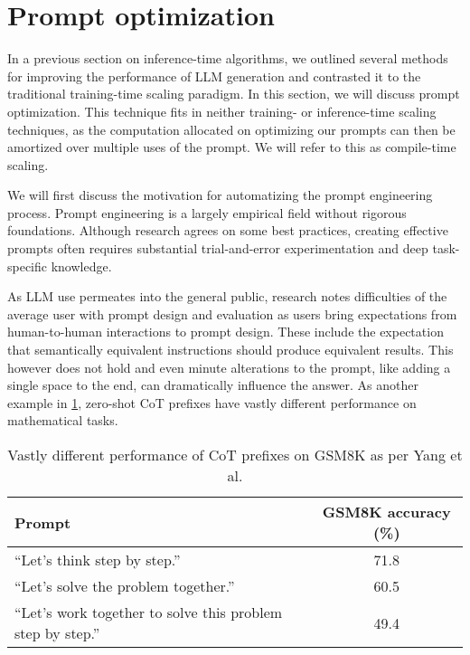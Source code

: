\section{Prompt optimization}
In a previous section on inference-time algorithms, we outlined several methods for improving the performance of LLM generation
and contrasted it to the traditional training-time scaling paradigm. In this section, we will discuss prompt optimization. 
This technique fits in neither training- or inference-time scaling techniques, as the computation allocated on
optimizing our prompts can then be amortized over multiple uses of the prompt. 
We will refer to this as compile-time\cite{schnabel2024symbolicpromptprogramsearch} scaling.

We will first discuss the motivation for automatizing the prompt engineering process. 
Prompt engineering is a largely empirical field without rigorous foundations.
Although research agrees on some best practices, creating effective prompts 
often requires substantial trial-and-error experimentation and deep task-specific 
knowledge\cite{xiang2025selfsupervisedpromptoptimization}.

As LLM use permeates into the general public, research\cite{10.1145/3544548.3581388} notes difficulties 
of the average user with prompt design and evaluation as users bring expectations from human-to-human 
interactions to prompt design. These include the expectation that semantically equivalent instructions 
should produce equivalent results. This however does not hold and even minute
alterations to the prompt, like adding a single space to the end, can dramatically influence the answer\cite{zhuo2024prosaassessingunderstandingprompt}\cite{salinas2024butterflyeffectalteringprompts}.
As another example in \ref{tab:cotprefixperf}, zero-shot CoT\cite{NEURIPS2022_8bb0d291} prefixes have vastly different performance on mathematical tasks.
\begin{table}[htbp]
    \centering
    \caption{Vastly different performance of CoT prefixes on GSM8K as per Yang et al.\cite{yang2024largelanguagemodelsoptimizers}}
    \label{tab:cotprefixperf}
    \begin{tabularx}{\linewidth}{Xc}
    \toprule
    \textbf{Prompt} & \textbf{GSM8K accuracy (\%)} \\
    \midrule
    ``Let's think step by step.'' & 71.8 \\
    ``Let's solve the problem together.'' & 60.5 \\
    ``Let's work together to solve this problem step by step.'' & 49.4 \\
    \bottomrule
    \end{tabularx}
\end{table}

